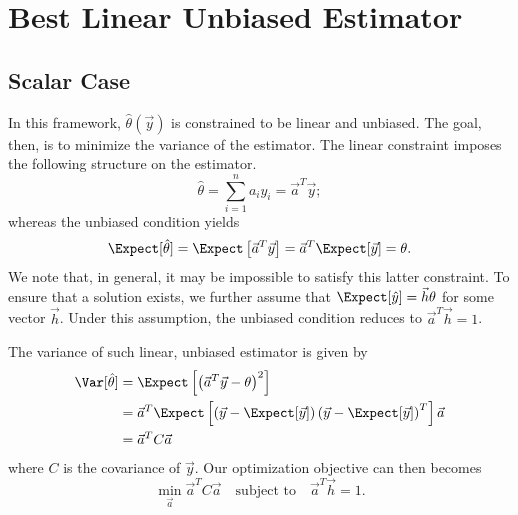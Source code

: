 \section{Best Linear Unbiased Estimator}


\subsection{Scalar Case}

In this framework, $\hat{\theta} (\vec{y})$ is constrained to be linear and unbiased.
The goal, then, is to minimize the variance of the estimator.
The linear constraint imposes the following structure on the estimator.
\begin{equation*}
\hat{\theta} = \sum_{i=1}^n a_i y_i = \vec{a}^T \vec{y} ;
\end{equation*}
whereas the unbiased condition yields
\begin{equation*}
\Expect [ \hat{\theta} ]
= \Expect \left[ \vec{a}^T \vec{y} \right]
= \vec{a}^T \Expect [ \vec{y} ] = \theta .
\end{equation*}
We note that, in general, it may be impossible to satisfy this latter constraint.
To ensure that a solution exists, we further assume that $\Expect [ \hat{y} ] = \vec{h} \theta$ for some vector $\vec{h}$.
Under this assumption, the unbiased condition reduces to $\vec{a}^T \vec{h} = 1$.

The variance of such linear, unbiased estimator is given by
\begin{equation*}
\begin{split}
\Var [ \hat{\theta} ]
&= \Expect \left[ \left( \vec{a}^T \vec{y} - \theta \right)^2 \right] \\
&= \vec{a}^T \Expect \left[ \left( \vec{y} - \Expect [\vec{y}] \right)
\left( \vec{y} - \Expect [\vec{y}] \right)^T \right] \vec{a} \\
&= \vec{a}^T C \vec{a}
\end{split}
\end{equation*}
where $C$ is the covariance of $\vec{y}$.
Our optimization objective can then becomes
\begin{equation*}
\min_{\vec{a}} \vec{a}^T C \vec{a} \quad \text{subject to} \quad \vec{a}^T \vec{h} = 1 .
\end{equation*}

